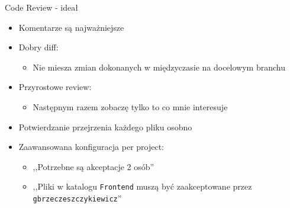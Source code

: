 \documentclass[ignorenonframetext]{beamer}
\begin{document}
\begin{frame}{Code Review - ideał}
\begin{itemize}
	\item Komentarze są najważniejsze
	\item Dobry diff:
	\begin{itemize} 
		\item Nie miesza zmian dokonanych w międzyczasie na docelowym branchu
	\end{itemize}
	\item Przyrostowe review:
	\begin{itemize} 
		\item Następnym razem zobaczę tylko to co mnie interesuje
	\end{itemize}
	\item Potwierdzanie przejrzenia każdego pliku osobno
	\item Zaawansowana konfiguracja per project:
	\begin{itemize}
		\item ,,Potrzebne są akceptacje 2 osób''
		\item ,,Pliki w katalogu \texttt{Frontend} muszą być zaakceptowane przez \texttt{gbrzeczeszczykiewicz}''
	\end{itemize}
\end{itemize}
\end{frame}
\end{document}
